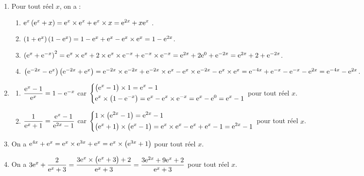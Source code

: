 \documentclass[a4paper,11pt]{article}
\begin{document}
\begin{enumerate}
	\item Pour tout réel $x$, on a :
	\begin{enumerate}
		\item ${\rm e}^x \left( {\rm e}^x + x \right) = {\rm e}^x \times {\rm e}^x + {\rm e}^x \times x = {\rm e}^{2x} + x{\rm e}^x$ .
		\item $\left( 1+{\rm e}^x \right)\left(1-{\rm e}^x\right) = 1 - {\rm e}^x + {\rm e}^x - {\rm e}^x \times {\rm e}^x = 1 - {\rm e}^{2x}$.
		\item $\left( {\rm e}^x + {\rm e}^{-x} \right)^2 =  {\rm e}^x \times {\rm e}^x + 2 \times {\rm e}^x \times {\rm e}^{-x} + {\rm e}^{-x} \times {\rm e}^{-x} = {\rm e}^{2x} + 2 {\rm e}^0 + {\rm e}^{-2x} = {\rm e}^{2x} + 2 + {\rm e}^{-2x}$.
		\item $\left( {\rm e}^{-2x}-{\rm e}^x \right)\left( {\rm e}^{-2x}+{\rm e}^x \right) = {\rm e}^{-2x} \times {\rm e}^{-2x} + {\rm e}^{-2x} \times {\rm e}^x - {\rm e}^x \times {\rm e}^{-2x} - {\rm e}^x \times {\rm e}^x = {\rm e}^{-4x} + {\rm e}^{-x} - {\rm e}^{-x} - {\rm e}^{2x} = {\rm e}^{-4x} - {\rm e}^{2x}$.
	\end{enumerate}
	\item 
	\begin{enumerate}
		\item $\dfrac{{\rm e}^x-1}{{\rm e}^x}=1-{\rm e}^{-x}$ car $\begin{dcases} \big({\rm e}^x-1\big) \times 1 = {\rm e}^x-1 \\ {\rm e}^x \times \big( 1-{\rm e}^{-x} \big) = {\rm e}^x - {\rm e}^x \times {\rm e}^{-x} = {\rm e}^x - {\rm e}^0 = {\rm e}^x - 1 \end{dcases}$ pour tout réel $x$.
		\item $\dfrac{1}{{\rm e}^x+1}=\dfrac{{\rm e}^x-1}{{\rm e}^{2x}-1}$ car $\begin{dcases} 1 \times \big( {\rm e}^{2x}-1\big) = {\rm e}^{2x}-1 \\ \big( {\rm e}^x+1\big) \times \big({\rm e}^x-1\big) = {\rm e}^x \times {\rm e}^x - {\rm e}^x + {\rm e}^x - 1 = {\rm e}^{2x} - 1  \end{dcases}$ pour tout réel $x$.
	\end{enumerate}
	\item On a ${\rm e}^{4x}+{\rm e}^x = {\rm e}^x \times {\rm e}^{3x} + {\rm e}^x = {\rm e}^x \times \big( {\rm e}^{3x} + 1\big)$ pour tout réel $x$.
	\item On a $3{\rm e}^x + \dfrac{2}{{\rm e}^x+3} = \dfrac{3{\rm e}^x \times \big({\rm e}^x+3\big)+2}{{\rm e}^x+3} = \dfrac{3{\rm e}^{2x}+9{\rm e}^x+2}{{\rm e}^x+3}$ pour tout réel $x$. 
\end{enumerate}

\medskip


\smallskip
\end{document}
